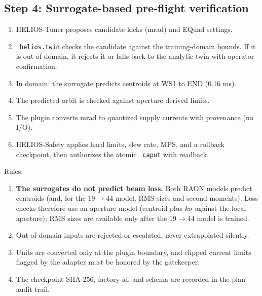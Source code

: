 \documentclass[11pt,a4paper]{article}
\newcommand{\tc}[1]{\texttt{\hbadness=10000 #1}}
\begin{document}
\subsection{Step 4: Surrogate-based pre-flight verification}
\begin{enumerate}
    \item HELIOS-Tuner proposes candidate kicks (mrad) and EQuad settings.
    \item \tc{helios.twin} checks the candidate against the training-domain bounds. If it is out of domain, it rejects it or falls back to the analytic twin with operator confirmation.
    \item In domain: the surrogate predicts centroids at WS1 to END (0.16 ms).
    \item The predicted orbit is checked against aperture-derived limits.
    \item The plugin converts mrad to quantized supply currents with provenance (no I/O).
    \item HELIOS-Safety applies hard limits, slew rate, MPS, and a rollback checkpoint, then authorizes the atomic \tc{caput} with readback.
\end{enumerate}
Rules:
\begin{enumerate}
    \item \textbf{The surrogates do not predict beam loss.} Both RAON models predict centroids (and, for the 19$\rightarrow$44 model, RMS sizes and second moments). Loss checks therefore use an aperture model (centroid plus $k\sigma$ against the local aperture); RMS sizes are available only after the 19$\rightarrow$44 model is trained.
    \item Out-of-domain inputs are rejected or escalated, never extrapolated silently.
    \item Units are converted only at the plugin boundary, and clipped current limits flagged by the adapter must be honored by the gatekeeper.
    \item The checkpoint SHA-256, factory id, and schema are recorded in the plan audit trail.
\end{enumerate}
\end{document}
